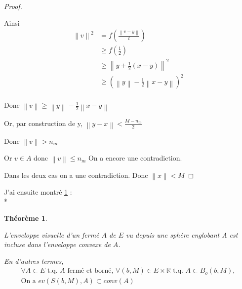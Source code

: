 \documentclass[a4paper]{article}
\newcommand{\norm}[1]{\left\lVert#1\right\rVert}
\newtheorem{theo}{Théorème}
\begin{document}
\begin{proof}
\begin{itemize}
    \medskip

    Ainsi 
    \begin{align*}
    \norm{v}^{2} &= f(\frac{\norm{v - y}}{t}) \\
                 &\geqslant f(\frac{1}{2}) \\
                 &\geqslant \norm{y + \frac{1}{2} (x - y)}^{2} \\
                 &\geqslant (\norm{y} - \frac{1}{2} \norm{x - y})^{2} \\
    \end{align*}

    Donc $\norm{v} \geqslant \norm{y} - \frac{1}{2} \norm{x - y}$

    Or, par construction de y, $\norm{y - x} < \frac{M - n_{m}}{2}$

    Donc $\norm{v} > n_{m}$

    Or $v \in A$  donc $\norm{v} \leqslant n_{m}$
    On a encore une contradiction.
    \end{itemize}

    \medskip

    Dans les deux cas on a une contradiction.
    Donc $\norm{x} < M$
    \end{proof}

    \bigskip

    J'ai ensuite montré \ref{th1} :\\*
    \begin{theo}\label{th1}

    L'enveloppe visuelle d'un fermé $A$ de $E$ vu depuis une sphère englobant A est incluse dans l'enveloppe convexe de $A$.

    En d'autres termes, 
    \begin{gather*}
    \forall A \subset E \text{ t.q. $A$ fermé et borné, } \forall (b, M) \in E \times \mathbb{R} \text{ t.q. } A \subset B_{o}(b, M), \\
    \text{On a } ev(S(b, M), A) \subset conv(A)
    \end{gather*}
    \end{theo}
\end{document}
